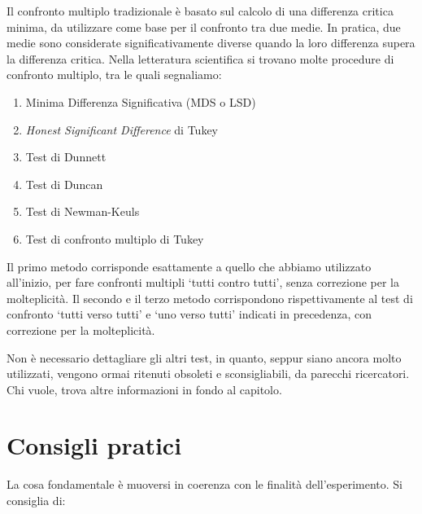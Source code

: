 \documentclass[a4paper,12pt,oneside]{book}
\providecommand{\tightlist}{%
  \setlength{\itemsep}{0pt}\setlength{\parskip}{0pt}}
\begin{document}
Il confronto multiplo tradizionale è basato sul calcolo di una differenza critica minima, da utilizzare come base per il confronto tra due medie. In pratica, due medie sono considerate significativamente diverse quando la loro differenza supera la differenza critica. Nella letteratura scientifica si trovano molte procedure di confronto multiplo, tra le quali segnaliamo:

\begin{enumerate}
\def\labelenumi{\arabic{enumi}.}
\tightlist
\item
  Minima Differenza Significativa (MDS o LSD)
\item
  \emph{Honest Significant Difference} di Tukey
\item
  Test di Dunnett
\item
  Test di Duncan
\item
  Test di Newman-Keuls
\item
  Test di confronto multiplo di Tukey
\end{enumerate}

Il primo metodo corrisponde esattamente a quello che abbiamo utilizzato all'inizio, per fare confronti multipli `tutti contro tutti', senza correzione per la molteplicità. Il secondo e il terzo metodo corrispondono rispettivamente al test di confronto `tutti verso tutti' e `uno verso tutti' indicati in precedenza, con correzione per la molteplicità.

Non è necessario dettagliare gli altri test, in quanto, seppur siano ancora molto utilizzati, vengono ormai ritenuti obsoleti e sconsigliabili, da parecchi ricercatori. Chi vuole, trova altre informazioni in fondo al capitolo.

\hypertarget{consigli-pratici}{%
\section{Consigli pratici}\label{consigli-pratici}}

La cosa fondamentale è muoversi in coerenza con le finalità dell'esperimento. Si consiglia di:
\end{document}
